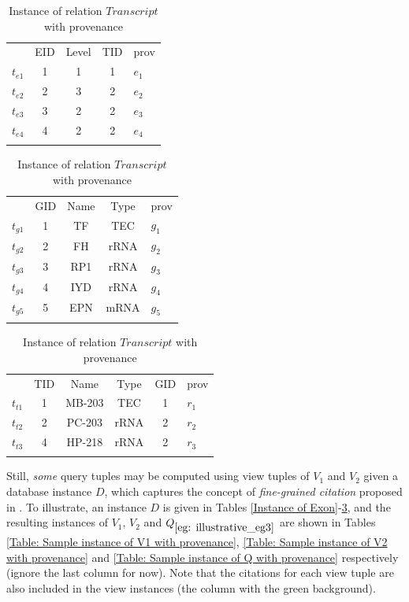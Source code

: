 \begin{example}
\begin{table}[htp]
\centering
\small
\caption{Instance of relation $Exon$ with provenance}\label{Instance of Exon}
\vspace*{-0.2cm}
\begin{tabular}[t]{c|c|c|c||b|} \hhline{~----}
&EID&Level&TID&prov\\ \hhline{~----}
$t_{e1}$&1&1&1&$e_1$\\ \hhline{~----}
$t_{e2}$&2&3&2&$e_2$\\ \hhline{~----}
$t_{e3}$&3&2&2&$e_3$\\ \hhline{~----}
$t_{e4}$&4&2&2&$e_4$\\ \hhline{~----}
\end{tabular}
\medskip
\caption{Instance of relation $Gene$ with provenance}\label{Instance of Gene}
\vspace*{-0.2cm}
\begin{tabular}[t]{c|c|c|c||b|} \hhline{~----}
&GID&Name&Type&prov\\ \hhline{~----}
$t_{g1}$&1&TF&TEC&$g_1$\\ \hhline{~----}
$t_{g2}$&2&FH&rRNA&$g_2$\\ \hhline{~----}
$t_{g3}$&3&RP1&rRNA&$g_3$\\ \hhline{~----}
$t_{g4}$&4&IYD&rRNA&$g_4$\\ \hhline{~----}
$t_{g5}$&5&EPN&mRNA&$g_5$\\ \hhline{~----}
\end{tabular}
\medskip
\caption{Instance of relation $Transcript$ with provenance}\label{Instance of Transcript}
\vspace*{-0.2cm}
\begin{tabular}[t]{c|c|c|c|c||b|} \hhline{~-----}
&TID&Name&Type&GID&prov\\ \hhline{~-----}
$t_{t1}$&1&MB-203&TEC&1&$r_1$\\ \hhline{~-----}
$t_{t2}$&2&PC-203&rRNA&2&$r_2$\\ \hhline{~-----}
$t_{t3}$&4&HP-218&rRNA&2&$r_3$\\ \hhline{~-----}
\end{tabular}
\end{table}


Still, {\em some} query tuples may be computed using view tuples of $V_1$ and $V_2$ given a database instance $D$, which captures the concept of {\em fine-grained citation} proposed in \cite{wu2018data}. To illustrate, an instance $D$ is given in Tables \ref{Instance of Exon}-\ref{Instance of Transcript}, and the resulting instances of $V_1$, $V_2$ and $Q_{\ref{eg: illustrative_eg3}}$ are shown in Tables \ref{Table: Sample instance of V1 with provenance}, \ref{Table: Sample instance of V2 with provenance} and \ref{Table: Sample instance of Q with provenance} respectively (ignore the last column for now). Note that the citations for each view tuple are also included in the view instances (the column with the green background).



\end{example}
